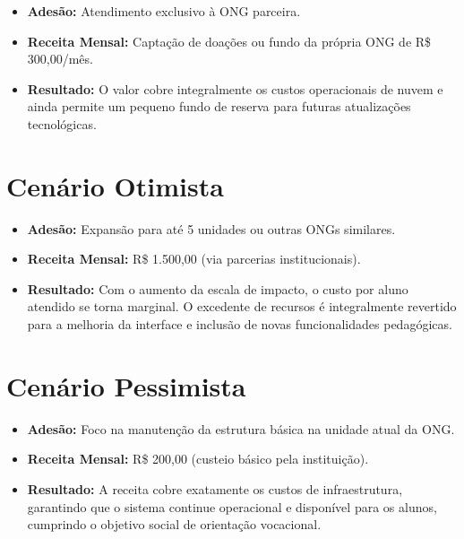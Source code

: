 \begin{itemize}
    \item \textbf{Adesão:} Atendimento exclusivo à ONG parceira.
    \item \textbf{Receita Mensal:} Captação de doações ou fundo da própria ONG de R\$ 300,00/mês.
    \item \textbf{Resultado:} O valor cobre integralmente os custos operacionais de nuvem e ainda permite um pequeno fundo de reserva para futuras atualizações tecnológicas.
\end{itemize}

\section{Cenário Otimista}

\begin{itemize}
    \item \textbf{Adesão:} Expansão para até 5 unidades ou outras ONGs similares.
    \item \textbf{Receita Mensal:} R\$ 1.500,00 (via parcerias institucionais).
    \item \textbf{Resultado:} Com o aumento da escala de impacto, o custo por aluno atendido se torna marginal. O excedente de recursos é integralmente revertido para a melhoria da interface e inclusão de novas funcionalidades pedagógicas.
\end{itemize}

\section{Cenário Pessimista}

\begin{itemize}
    \item \textbf{Adesão:} Foco na manutenção da estrutura básica na unidade atual da ONG.
    \item \textbf{Receita Mensal:} R\$ 200,00 (custeio básico pela instituição).
    \item \textbf{Resultado:} A receita cobre exatamente os custos de infraestrutura, garantindo que o sistema continue operacional e disponível para os alunos, cumprindo o objetivo social de orientação vocacional.
\end{itemize}
